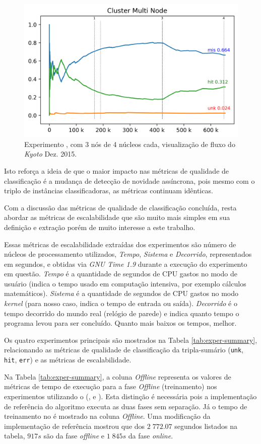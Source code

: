 \begin{figure}[htb]
  \centering
  \includegraphics[width=0.75\linewidth]{experiments/tmi-n12-log.png}
  \caption{Experimento \expD, \mfog com 3 nós de 4 núcleos cada, visualização de
  fluxo do \dataset \emph{Kyoto} Dez. 2015.}
  \label{fig:multi-flow}
\end{figure}

Isto reforça a ideia de que o maior impacto nas métricas de qualidade de
classificação é a mudança de detecção de novidade assíncrona, pois mesmo com o
triplo de instâncias classificadoras, as métricas continuam idênticas.

Com a discussão das métricas de qualidade de classificação concluída, resta
abordar as métricas de escalabilidade que são muito mais simples em sua
definição e extração porém de muito interesse a este trabalho.

Essas métricas de escalabilidade extraídas dos experimentos são número de
núcleos de processamento utilizados, \emph{Tempo}, \emph{Sistema} e
\emph{Decorrido}, representados em segundos, e obtidas via \emph{GNU Time 1.9}
durante a execução do experimento em questão.
\emph{Tempo} é a quantidade de segundos de CPU gastos no modo de usuário
(indica o tempo usado em computação intensiva, por exemplo cálculos matemáticos).
\emph{Sistema} é a quantidade de segundos de CPU gastos no modo \emph{kernel} (para
nosso caso, indica o tempo de entrada ou saída).
\emph{Decorrido} é o tempo decorrido do mundo real (relógio de parede) e indica
quanto tempo o programa levou para ser concluído.
Quanto mais baixos os tempos, melhor.

Os quatro experimentos principais são mostrados na Tabela
\ref{tab:exper-summary}, relacionando as métricas de qualidade de classificação
da tripla-sumário (\texttt{unk}, \texttt{hit}, \texttt{err}) e as métricas de
escalabilidade.

Na Tabela \ref{tab:exper-summary}, a coluna \emph{Offline} representa os valores
de métricas de tempo de execução para a fase \emph{Offline} (treinamento) nos
experimentos utilizando o \mfog (\expB, \expC e \expD).
Esta distinção é necessária pois a implementação de referência do algoritmo
\minas executa as duas fases sem separação. Já o tempo de treinamento no \mfog é
mostrado na coluna \emph{Offline}.
Uma modificação da implementação de referência mostrou que dos $2\;772.07$
segundos listados na tabela, $917s$ são da fase \emph{offline} e $1\;845s$ da
fase \emph{online}.

